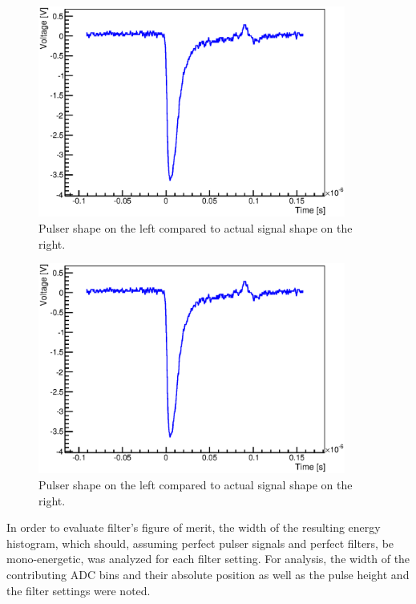   \begin{figure}
	\includegraphics[width = 0.9\textwidth]{graphics/muonModules/monSpec/muonSignal.eps}
	\caption[Muon signal shape]{Pulser shape on the left compared to actual signal shape on the right. }
  \end{figure}
	\begin{figure}
	\includegraphics[width = 0.9\textwidth]{graphics/muonModules/monSpec/muonSignal.eps}
	\caption[Pulser and signal shape]{Pulser shape on the left compared to actual signal shape on the right. }
  \end{figure}
  
  In order to evaluate filter's figure of merit, the width of the resulting energy histogram, which should, assuming perfect pulser signals and perfect filters, be mono-energetic, was analyzed for each filter setting. For analysis, the width of the contributing ADC bins and their absolute position as well as the pulse height and the filter settings were noted. 
  
